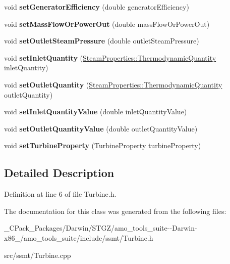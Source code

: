 \begin{DoxyCompactItemize}
void {\bfseries set\+Generator\+Efficiency} (double generator\+Efficiency)
\item 
\mbox{\label{class_turbine_a73522631e2eeefa8ea14d5b537e3e760}} 
void {\bfseries set\+Mass\+Flow\+Or\+Power\+Out} (double mass\+Flow\+Or\+Power\+Out)
\item 
\mbox{\label{class_turbine_ab9612657de02e4523492b687917b4091}} 
void {\bfseries set\+Outlet\+Steam\+Pressure} (double outlet\+Steam\+Pressure)
\item 
\mbox{\label{class_turbine_aecc05c70870fb11bbc0bb4fe5d8438bd}} 
void {\bfseries set\+Inlet\+Quantity} (\hyperlink{class_steam_properties_ae0294bedf7d178c2d8fb6aed0f62fbff}{Steam\+Properties\+::\+Thermodynamic\+Quantity} inlet\+Quantity)
\item 
\mbox{\label{class_turbine_ad5ff4ba1657aac9519a6841336ec571c}} 
void {\bfseries set\+Outlet\+Quantity} (\hyperlink{class_steam_properties_ae0294bedf7d178c2d8fb6aed0f62fbff}{Steam\+Properties\+::\+Thermodynamic\+Quantity} outlet\+Quantity)
\item 
\mbox{\label{class_turbine_ac01a053462c83e21ecc2158e75477542}} 
void {\bfseries set\+Inlet\+Quantity\+Value} (double inlet\+Quantity\+Value)
\item 
\mbox{\label{class_turbine_ab37326068f633280de8f8144b9c8eb89}} 
void {\bfseries set\+Outlet\+Quantity\+Value} (double outlet\+Quantity\+Value)
\item 
\mbox{\label{class_turbine_abb3f16cefe52f4e9c7b32b2bb17a68ee}} 
void {\bfseries set\+Turbine\+Property} (Turbine\+Property turbine\+Property)
\end{DoxyCompactItemize}


\subsection{Detailed Description}


Definition at line 6 of file Turbine.\+h.



The documentation for this class was generated from the following files\+:\begin{DoxyCompactItemize}
\item 
\+\_\+\+C\+Pack\+\_\+\+Packages/\+Darwin/\+S\+T\+G\+Z/amo\+\_\+tools\+\_\+suite-\/-\/\+Darwin-\/x86\+\_/amo\+\_\+tools\+\_\+suite/include/ssmt/Turbine.\+h\item 
src/ssmt/Turbine.\+cpp\end{DoxyCompactItemize}
